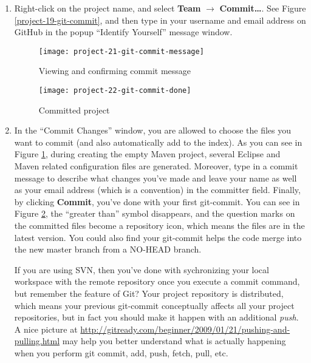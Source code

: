 \begin{enumerate}

\item Right-click on the project name, and select \textbf{Team} $\rightarrow$
\textbf{Commit\ldots}. See Figure \ref{project-19-git-commit}, and then type in
your username and email address on GitHub in the popup ``Identify Yourself''
message window.

\begin{figure}[t]
\centering
\texttt{[image: project-21-git-commit-message]}
\caption{Viewing and confirming commit message\label{project-21-git-commit-message}}
\end{figure}

\begin{figure}[t]
\centering
\texttt{[image: project-22-git-commit-done]}
\caption{Committed project\label{project-22-git-commit-done}}
\end{figure}

\item In the ``Commit Changes'' window, you are allowed to choose the files you
want to commit (and also automatically add to the index). As you can see in
Figure \ref{project-21-git-commit-message}, during creating the empty Maven
project, several Eclipse and Maven related configuration files are generated.
Moreover, type in a commit message to describe what changes you've made and
leave your name as well as your email address (which is a convention) in the
committer field. Finally, by clicking \textbf{Commit}, you've done with your
first git-commit. You can see in Figure \ref{project-22-git-commit-done}, the
``greater than'' symbol disappears, and the question marks on the committed
files become a repository icon, which means the files are in the latest version.
You could also find your git-commit helps the code merge into the new master
branch from a NO-HEAD branch.

If you are using SVN, then you've done with sychronizing your local workspace
with the remote repository once you execute a commit command, but remember the
feature of Git? Your project repository is distributed, which means your
previous git-commit conceptually affects all your project repositories, but in
fact you should make it happen with an additional \emph{push}. A nice picture at
\url{http://gitready.com/beginner/2009/01/21/pushing-and-pulling.html} may help
you better understand what is actually happening when you perform git commit,
add, push, fetch, pull, etc.


\end{enumerate}
